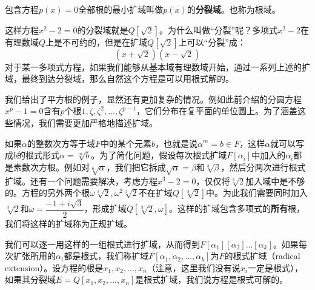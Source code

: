 \documentclass[b5paper]{ctexart}
\begin{document}
 
\begin{definition}
包含方程$p(x) = 0$全部根的最小扩域叫做$p(x)$的\textbf{分裂域}。也称为根域。
\end{definition}

这样方程$x^2 -2 = 0$的分裂域就是$Q[\sqrt{2}]$。为什么叫做“分裂”呢？多项式$x^2-2$在有理数域$Q$上是不可约的，但是在扩域$Q[\sqrt{2}]$上可以“分裂”成：
\[
(x + \sqrt{2}) (x - \sqrt{2})
\]
对于某一多项式方程，如果我们能够从基本域有理数域开始，通过一系列上述的扩域，最终到达分裂域，那么自然这个方程是可以用根式解的。

我们给出了平方根的例子，显然还有更加复杂的情况。例如此前介绍的分圆方程$x^p-1=0$含有$p$个根$1, \zeta, \zeta^2, ..., \zeta^{p-1}$，它们分布在复平面的单位圆上。为了涵盖这些情况，我们需要更加严格地描述扩域。


如果$\alpha$的整数次方等于域$F$中的某个元素$b$，也就是说$\alpha^m = b \in F$，这样$\alpha$就可以写成$b$的根式形式$\alpha = \sqrt[m]{b}$。为了简化问题，假设每次根式扩域$F[\alpha_i]$中加入的$\alpha_i$都是素数次方根。例如对$\sqrt[6]{\alpha}$，我们把它拆成$\sqrt{\alpha} = \beta$和$\sqrt[3]{\beta}$，然后分两次进行根式扩域。还有一个问题需要解决，考虑方程$x^3 - 2 = 0$，仅仅将$\sqrt[3]{2}$加入域中是不够的。方程的另外两个根$\omega\sqrt[3]{2}, \omega^2\sqrt[3]{2}$不在扩域$Q[\sqrt[3]{2}]$中。为此我们需要同时加入$\sqrt[3]{2}$和$\omega = \dfrac{-1 + i\sqrt{3}}{2}$，形成扩域$Q[\sqrt[3]{2}, \omega]$。这样的扩域包含多项式的\textbf{所有}根，我们将这样的扩域称为正规扩域。

我们可以逐一用这样的一组根式进行扩域，从而得到$F[\alpha_1][\alpha_2]...[\alpha_k]$。如果每次扩张所用的$\alpha_i$都是根式，我们称扩域$F[\alpha_1, \alpha_2, ..., \alpha_k]$为$F$的根式扩域（radical extension）。设方程的根是$x_1, x_2, ..., x_n$（注意，这里我们没有说$x_i$一定是根式），如果其分裂域$E = Q[x_1, x_2, ..., x_n]$是根式扩域，我们说方程是根式可解的。
\end{document}
